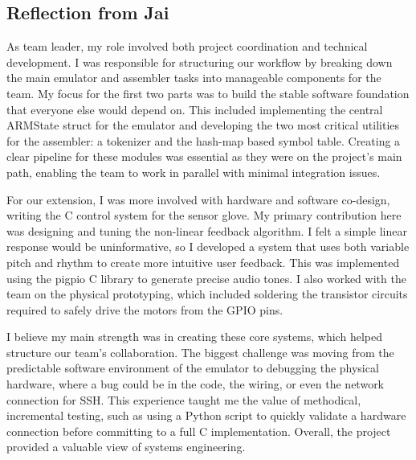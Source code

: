 \documentclass[11pt]{article}
\begin{document}
\subsection{Reflection from Jai}
As team leader, my role involved both project coordination and technical development. I was responsible for structuring our workflow by breaking down the 
main emulator and assembler tasks into manageable components for the team. My focus for the first two parts was to build the stable software foundation that 
everyone else would depend on. This included implementing the central ARMState struct for the emulator and developing the two most critical utilities for the 
assembler: a tokenizer and the hash-map based symbol table. Creating a clear pipeline for these modules was essential as they were on the project's main path, 
enabling the team to work in parallel with minimal integration issues.


For our extension, I was more involved with hardware and software co-design, writing the C control system for the sensor glove. My primary contribution here was 
designing and tuning the non-linear feedback algorithm. I felt a simple linear response would be uninformative, so I developed a system that uses both variable 
pitch and rhythm to create more intuitive user feedback. This was implemented using the pigpio C library to generate precise audio tones. I also worked with the 
team on the physical prototyping, which included soldering the transistor circuits required to safely drive the motors from the GPIO pins.

I believe my main strength was in creating these core systems, which helped structure our team's collaboration. The biggest challenge was moving from the 
predictable software environment of the emulator to debugging the physical hardware, where a bug could be in the code, the wiring, or even the network 
connection for SSH. This experience taught me the value of methodical, incremental testing, such as using a Python script to quickly validate a hardware 
connection before committing to a full C implementation. Overall, the project provided a valuable view of systems engineering.
\end{document}
